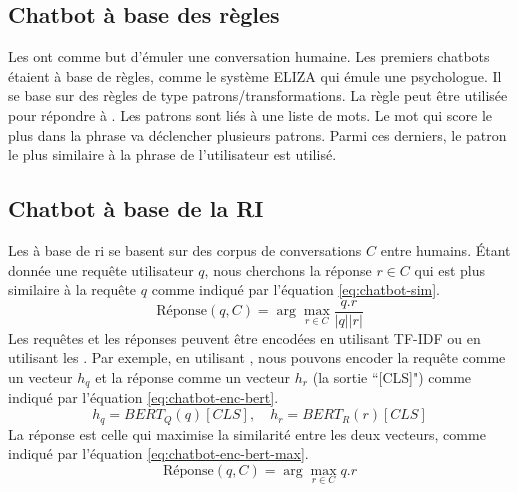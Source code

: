 \documentclass{KodeBook}
\begin{document}
\subsection{Chatbot à base des règles}

Les  ont comme but d'émuler une conversation humaine. 
Les premiers chatbots étaient à base de règles, comme le système ELIZA \cite{1966-Weizenbaum} qui émule une psychologue. 
Il se base sur des règles de type patrons/transformations. 
La règle  peut être utilisée pour répondre à . 
Les patrons sont liés à une liste de mots. 
Le mot qui score le plus dans la phrase va déclencher plusieurs patrons. 
Parmi ces derniers, le patron le plus similaire à la phrase de l'utilisateur est utilisé.

\subsection{Chatbot à base de la RI}

Les  à base de \ac{ri} se basent sur des corpus de conversations $C$ entre humains. 
Étant donnée une requête utilisateur $q$, nous cherchons la réponse $r \in C$ qui est plus similaire à la requête $q$ comme indiqué par l'équation \ref{eq:chatbot-sim}.
\begin{equation}\label{eq:chatbot-sim}
\text{Réponse}(q, C) = \arg\max_{r \in C} \frac{q . r}{|q| |r|}
\end{equation}
Les requêtes et les réponses peuvent être encodées en utilisant TF-IDF ou en utilisant les .
Par exemple, en utilisant , nous pouvons encoder la requête comme un vecteur $h_q$ et la réponse comme un vecteur $h_r$ (la sortie ``[CLS]") comme indiqué par l'équation \ref{eq:chatbot-enc-bert}.
\begin{equation}\label{eq:chatbot-enc-bert}
h_q = BERT_Q(q)[CLS],\quad h_r = BERT_R(r)[CLS]
\end{equation} 
La réponse est celle qui maximise la similarité entre les deux vecteurs, comme indiqué par l'équation \ref{eq:chatbot-enc-bert-max}.
\begin{equation}\label{eq:chatbot-enc-bert-max}
\text{Réponse}(q, C) = \arg\max_{r \in C} q . r
\end{equation}
\end{document}
